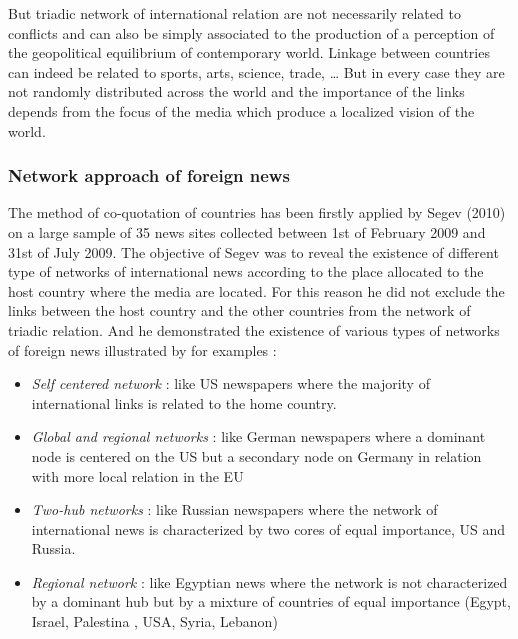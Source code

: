 \documentclass[
]{article}
\providecommand{\tightlist}{%
  \setlength{\itemsep}{0pt}\setlength{\parskip}{0pt}}
\begin{document}
But triadic network of international relation are not necessarily
related to conflicts and can also be simply associated to the production
of a perception of the geopolitical equilibrium of contemporary world.
Linkage between countries can indeed be related to sports, arts,
science, trade, \ldots{} But in every case they are not randomly
distributed across the world and the importance of the links depends
from the focus of the media which produce a localized vision of the
world.

\hypertarget{network-approach-of-foreign-news}{%
\subsubsection{Network approach of foreign
news}\label{network-approach-of-foreign-news}}

The method of co-quotation of countries has been firstly applied by
Segev (2010) on a large sample of 35 news sites collected between 1st of
February 2009 and 31st of July 2009. The objective of Segev was to
reveal the existence of different type of networks of international news
according to the place allocated to the host country where the media are
located. For this reason he did not exclude the links between the host
country and the other countries from the network of triadic relation.
And he demonstrated the existence of various types of networks of
foreign news illustrated by for examples :

\begin{itemize}
\tightlist
\item
  \emph{Self centered network} : like US newspapers where the majority
  of international links is related to the home country.
\item
  \emph{Global and regional networks} : like German newspapers where a
  dominant node is centered on the US but a secondary node on Germany in
  relation with more local relation in the EU
\item
  \emph{Two-hub networks} : like Russian newspapers where the network of
  international news is characterized by two cores of equal importance,
  US and Russia.
\item
  \emph{Regional network} : like Egyptian news where the network is not
  characterized by a dominant hub but by a mixture of countries of equal
  importance (Egypt, Israel, Palestina , USA, Syria, Lebanon)
\end{itemize}
\end{document}
